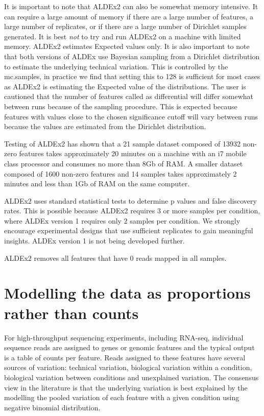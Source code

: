 \documentclass[11pt]{amsart}
\begin{document}
It is important to note that ALDEx2 can also be somewhat memory intensive. It can require a large amount of memory if there are a large number of features, a large number of replicates, or if there are a large number of Dirichlet samples generated. It is best \emph{not} to try and run ALDEx2 on a machine with limited memory. ALDEx2 estimates Expected values only. It is also important to note that both versions of ALDEx use Bayesian sampling from a Dirichlet distribution to estimate  the underlying technical variation. This is controlled by the mc.samples, in practice we find that setting this to 128 is sufficient for most cases as ALDEx2 is estimating the Expected value of the distributions. The user is cautioned that the number of features called as differential will differ somewhat between runs because of the sampling procedure. This is expected because features with values close to the chosen significance cutoff will vary between runs because the values are estimated from the Dirichlet distribution. 

Testing of ALDEx2 has shown that a 21 sample dataset composed of 13932 non-zero features takes approximately 20 minutes on a machine with an i7 mobile class processor and consumes no more than 8Gb of RAM. A smaller dataset composed of 1600 non-zero features and 14 samples takes approximately 2 minutes and less than 1Gb of RAM on the same computer.

ALDEx2 uses standard statistical tests to determine p values and false discovery rates. This is possible because ALDEx2 requires 3 or more samples per condition, where ALDEx version 1 requires only 2 samples per condition. We strongly encourage experimental designs that use sufficient replicates to gain meaningful insights. ALDEx version 1 is not being developed further.

ALDEx2 removes all features that have 0 reads mapped in all samples.

\section{Modelling the data as proportions rather than counts}
For high-throughput sequencing experiments, including RNA-seq, individual sequence reads are assigned to genes or genomic features and the typical output is a table of counts per feature. Reads assigned to these features have several sources of variation: technical variation, biological variation within a condition, biological variation between conditions and unexplained variation. The consensus view in the literature is that the underlying variation is best explained by the modelling the pooled variation of each feature with a given condition using negative binomial distribution. 
\end{document}
